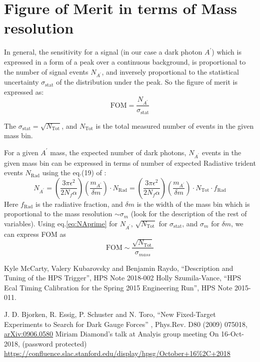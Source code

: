 \documentclass[letterpaper,12pt]{article}
\def \dstl {\displaystyle}
\begin{document}
\appendix
\appendixpage
\addappheadtotoc
\section{Figure of Merit in terms of Mass resolution}
\label{sec:AppendixFOM}
In general, the sensitivity for a signal (in our case a dark photon $A^{\prime}$) which is expressed in a form of a peak over a continuous background, is proportional to the number of signal events $\dstl N_{A^{\prime}}$, and inversely proportional to the statistical uncertainty $\sigma_{\mathrm{stat}}$ of the distribution under the peak.
So the figure of merit is expressed as:
\begin{equation}
 \mathrm{FOM} = \frac{\dstl N_{A^{\prime}}}{\dstl \sigma_{\mathrm{stat}}}
 \label{eq:FOM_massres}
\end{equation}

The $\sigma_{\mathrm{stat}} = \sqrt{N_{\mathrm{Tot}}}$, and $N_{\mathrm{Tot}}$ is the total measured number of events in the given mass bin.

For a given $A^{\prime}$ mass, the expected number of dark photons, 
$\dstl N_{A^{\prime}}$ events in the given mass bin  can be expressed in terms of number of expected Radiative trident events $N_{\mathrm{Rad}}$ using the eq.(19) of \cite{AprimeFixedTargetTheory}:
\begin{equation}
 N_{A^{\prime}} = \left(\frac{\dstl 3\pi \epsilon^{2}}{\dstl 2 N_{f} \alpha}\right) \left( \frac{\dstl m_{A^{\prime}}}{\delta m} \right)\cdot N_{\mathrm{Rad}} = \left(\frac{\dstl 3\pi \epsilon^{2}}{\dstl 2 N_{f} \alpha}\right) \left( \frac{\dstl m_{A^{\prime}}}{\delta m} \right) \cdot N_{\mathrm{Tot}}\cdot f_{\mathrm{Rad}}
 \label{eq:NAprime}
\end{equation}
Here $f_{\mathrm{Rad}}$ is the radiative fraction, and $\delta m$ is the width of the mass bin which is proportional to the mass resolution $\sim \sigma_{m}$ (look \cite{AprimeFixedTargetTheory} for the description of the rest of variables). 
Using eq.\ref{eq:NAprime} for $N_{A^{\prime}}$, $\dstl\sqrt{N_{\mathrm{Tot}}}$ for 
$\sigma_{\mathrm{stat}}$, and $\dstl \sigma_{m}$ for $\delta m$, we can express FOM as
\begin{equation}
 \mathrm {FOM} \sim \frac{\dstl \sqrt{N_{\mathrm{Tot}}}}{\sigma_{mass}}
\end{equation}


\begin{thebibliography}{55}
  Kyle McCarty, Valery Kubarovsky and Benjamin Raydo, ``Description and Tuning of the HPS Trigger'', HPS Note 2018-002
  Holly Szumila-Vance, ``HPS Ecal Timing Calibration for the
Spring 2015 Engineering Run'', HPS Note 2015-011.

 J. D. Bjorken, R. Essig, P. Schuster and N. Toro, ``New Fixed-Target Experiments to Search for Dark Gauge Forces'' , Phys.Rev. D80 (2009) 075018, \href{https://arxiv.org/abs/0906.0580}{arXiv:0906.0580}
 Miriam Diamond's talk at Analyis group meeting On 16-Oct-2018, (password protected) \href{https://confluence.slac.stanford.edu/display/hpsg/October+16%2C+2018}{https://confluence.slac.stanford.edu/display/hpsg/October+16\%2C+2018}
\end{thebibliography}
\end{document}
